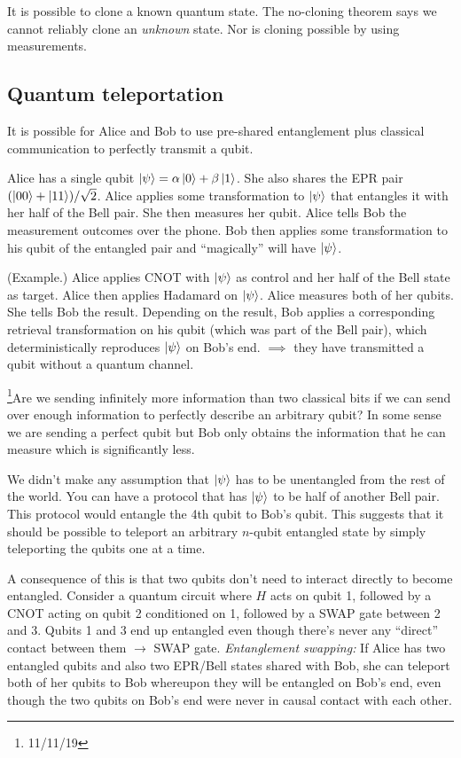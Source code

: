 \documentclass[12pt]{article}
\begin{document}
It is possible to clone a known quantum state. The no-cloning theorem says we
cannot reliably clone an \emph{unknown} state. Nor is cloning possible by using
measurements.

\subsection{Quantum teleportation}
It is possible for Alice and Bob to use pre-shared entanglement plus classical
communication to perfectly transmit a qubit.

Alice has a single qubit $\ket{\psi} = \alpha\ket{0} + \beta\ket{1}$. She also
shares the EPR pair $(\ket{00} + \ket{11})/\sqrt{2}$. Alice applies some
transformation to $\ket{\psi}$ that entangles it with her half of the Bell
pair. She then measures her qubit. Alice tells Bob the measurement outcomes
over the phone. Bob then applies some transformation to his qubit of the
entangled pair and ``magically'' will have $\ket{\psi}$.

(Example.) Alice applies CNOT with $\ket{\psi}$ as control and her half of the
Bell state as target. Alice then applies Hadamard on $\ket{\psi}$. Alice
measures both of her qubits. She tells Bob the result. Depending on the result,
Bob applies a corresponding retrieval transformation on his qubit (which was
part of the Bell pair), which deterministically reproduces $\ket{\psi}$ on
Bob's end. $\implies$ they have transmitted a qubit without a quantum channel.

\footnote{11/11/19}Are we sending infinitely more information than two
classical bits if we can send over enough information to perfectly describe an
arbitrary qubit? In some sense we are sending a perfect qubit but Bob only
obtains the information that he can measure which is significantly less.

We didn't make any assumption that $\ket{\psi}$ has to be unentangled from the
rest of the world. You can have a protocol that has $\ket{\psi}$ to be half of
another Bell pair. This protocol would entangle the 4th qubit to Bob's qubit.
This suggests that it should be possible to teleport an arbitrary $n$-qubit
entangled state by simply teleporting the qubits one at a time.

A consequence of this is that two qubits don't need to interact directly to
become entangled.  Consider a quantum circuit where $H$ acts on qubit 1,
followed by a CNOT acting on qubit 2 conditioned on 1, followed by a SWAP gate
between 2 and 3. Qubits 1 and 3 end up entangled even though there's never any
``direct'' contact between them $\rightarrow$ SWAP gate.  \emph{Entanglement
swapping:} If Alice has two entangled qubits and also two EPR/Bell states
shared with Bob, she can teleport both of her qubits to Bob whereupon they will
be entangled on Bob's end, even though the two qubits on Bob's end were never
in causal contact with each other.
\end{document}
